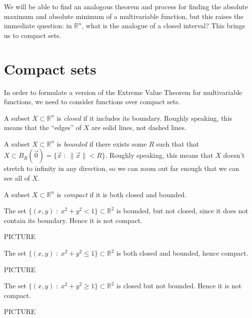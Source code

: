 \documentclass{ximera}
\begin{document}
We will be able to find an analogous theorem and process for finding the absolute maximum and absolute minimum of a multivariable function, but this raises the immediate question: in $\mathbb{R}^n$, what is the analogue of a closed interval? This brings us to compact sets.

\section*{Compact sets}

In order to formulate a version of the Extreme Value Theorem for multivariable functions, we need to consider functions over compact sets.

\begin{definition}
A subset $X\subset\mathbb{R}^n$ is \emph{closed} if it includes its boundary. Roughly speaking, this means that the ``edges'' of $X$ are solid lines, not dashed lines.

A subset $X\subset\mathbb{R}^n$ is \emph{bounded} if there exists some $R$ such that that $X\subset B_R(\vec{0}) = \{\vec{x}\;:\;\|\vec{x}\|<R\}$. Roughly speaking, this means that $X$ doesn't stretch to infinity in any direction, so we can zoom out far enough that we can see all of $X$.

A subset $X\subset\mathbb{R}^n$ is \emph{compact} if it is both closed and bounded.
\end{definition}

\begin{example}
The set $\{(x,y)\;:\;x^2+y^2<1\}\subset\mathbb{R}^2$ is bounded, but not closed, since it does not contain its boundary. Hence it is not compact.

PICTURE

The set $\{(x,y)\;:\;x^2+y^2\leq 1\}\subset\mathbb{R}^2$ is both closed and bounded, hence compact.

PICTURE

The set $\{(x,y)\;:\;x^2+y^2\geq 1\}\subset\mathbb{R}^2$ is  closed but not bounded. Hence it is not compact.

PICTURE

\end{example}
\end{document}
